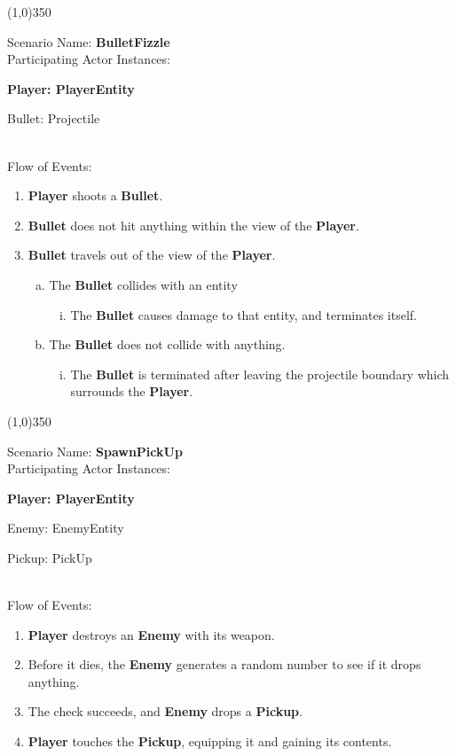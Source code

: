 \documentclass[12pt]{article}       %
\begin{document}
\begin{center} \line(1,0){350} \end{center}
Scenario Name: {\bf BulletFizzle} \\
Participating Actor Instances:        \hspace{46pt} {\bf Player: PlayerEntity

					          \hspace{2.6 in}   Bullet: Projectile}  \vspace{10pt}  \\ 
Flow of Events: 
\begin{enumerate} 
\item {\bf Player} shoots a {\bf Bullet}.
\item {\bf Bullet} does not hit anything within the view of the {\bf Player}.
\item {\bf Bullet} travels out of the view of the {\bf Player}.
      \begin{enumerate}[a.]
       \item The {\bf Bullet} collides with an entity
                \begin{enumerate}[i.]
                \item The {\bf Bullet} causes damage to that entity, and terminates itself.
                \end{enumerate}
      \item The {\bf Bullet} does not collide with anything.
                \begin{enumerate}[i.]
                \item The {\bf Bullet} is terminated after leaving the projectile boundary which surrounds the {\bf Player}.
                \end{enumerate}
        \end{enumerate}
\end{enumerate}

\begin{center} \line(1,0){350} \end{center}
Scenario Name: {\bf SpawnPickUp} \\
Participating Actor Instances:        \hspace{46pt} {\bf Player: PlayerEntity
	
						\hspace{2.6 in} Enemy: EnemyEntity

					          \hspace{2.6 in}  Pickup: PickUp}  \vspace{10pt}  \\ 
Flow of Events: 
\begin{enumerate} 
\item {\bf Player} destroys an {\bf Enemy} with its weapon.
\item Before it dies, the {\bf Enemy} generates a random number to see if it drops anything.
\item The check succeeds, and {\bf Enemy} drops a {\bf Pickup}.
\item {\bf Player} touches the {\bf Pickup}, equipping it and gaining its contents.
\end{enumerate}
\end{document}
